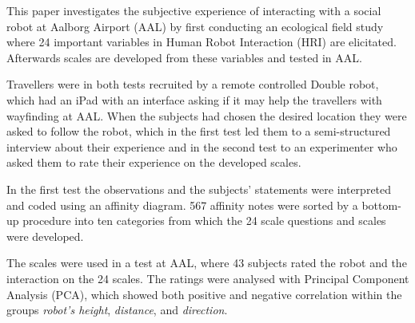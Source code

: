 \label{Abstract}
This paper investigates the subjective experience of interacting with a social robot at Aalborg Airport (AAL) by first conducting an ecological field study where 24 important variables in Human Robot Interaction (HRI) are elicitated. Afterwards scales are developed from these variables and tested in AAL. 

Travellers were in both tests recruited by a remote controlled Double robot, which had an iPad with an interface asking if it may help the travellers with wayfinding at AAL. When the subjects had chosen the desired location they were asked to follow the robot, which in the first test led them to a semi-structured interview about their experience and in the second test to an experimenter who asked them to rate their experience on the developed scales. 


In the first test the observations and the subjects' statements were interpreted and coded using an affinity diagram. 567 affinity notes were sorted by a bottom-up procedure into ten categories from which the 24 scale questions and scales were developed. 

The scales were used in a test at AAL, where 43 subjects rated the robot and the interaction on the 24 scales. The ratings were analysed with Principal Component Analysis (PCA), which showed both positive and negative correlation within the groups \textit{robot's height}, \textit{distance}, and \textit{direction}. 


%
%



